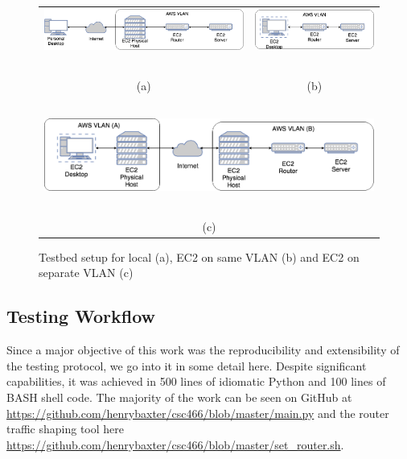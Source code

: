 \documentclass[12pt]{article}
\begin{document}
\begin{figure}
\begin{tabular}{c c}
\includegraphics[scale=.25]{images/local.png} & \includegraphics[scale=.25]{images/aws.png}\\
~ & ~ \\
(a) & (b) \\
~ & ~ \\
\multicolumn{2}{c}{\includegraphics[scale=.25]{images/aws_inet.png}} \\
~ & ~ \\
\multicolumn{2}{c}{(c)} \\
\end{tabular}
\caption{Testbed setup for local (a), EC2 on same VLAN (b) and EC2 on separate VLAN (c)}
\label{fig:network}
\end{figure}

\subsection{Testing Workflow}
Since a major objective of this work was the reproducibility and extensibility of the testing protocol, we go into it in some detail here. Despite significant capabilities, it was achieved in 500 lines of idiomatic Python and 100 lines of BASH shell code. The majority of the work can be seen on GitHub at \url{https://github.com/henrybaxter/csc466/blob/master/main.py} and the router traffic shaping tool here \url{https://github.com/henrybaxter/csc466/blob/master/set_router.sh}.
\end{document}
